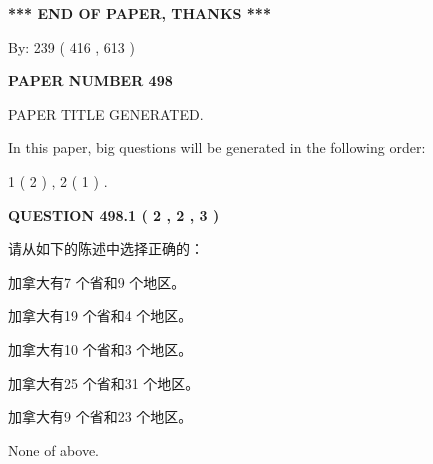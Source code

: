\documentclass{ctexart}
\begin{document}
   
   
   
\vspace{1.0in} 
{\textbf{\large{ *** END OF PAPER, THANKS *** }}} 
   
   
\hspace{1.0in} By: 
 239 ( 416 ,  613 )
   
   
   
   
\newpage 
\setcounter{page}{ 
   498001 } 
   
   
   
   
 {\textbf{ \Large{ PAPER NUMBER  498  }}}
   
   
\vspace{0.2in}
   
   
   
   
   
   
   
   
 \vspace{0.2in}
 
 
 
 
   
   
 PAPER TITLE GENERATED.
   
   
   
\vspace{0.2in}
   
In this paper, big questions will be generated in the following order: 
   
   
   1 ( 2 )
 ,
   2 ( 1 )
 .
  
\vspace{0.2in}
  
{\textbf{\Large{QUESTION
498.1 
 ( 2 , 2 , 3 )
}}}
  
  
请从如下的陈述中选择正确的：
 
 
加拿大有7 个省和9 个地区。
 
 
加拿大有19 个省和4 个地区。
 
 
加拿大有10 个省和3 个地区。
 
 
加拿大有25 个省和31 个地区。
 
 
加拿大有9 个省和23 个地区。
 
 
 None of above.
 
 
\noindent{}
 
\end{document}
